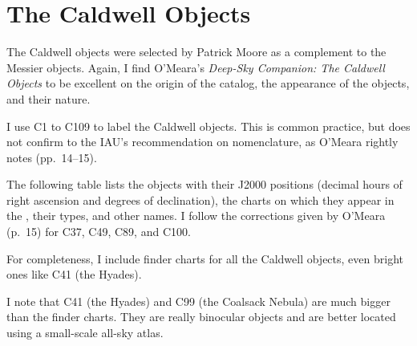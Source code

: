 
\chapter*{The Caldwell Objects}

The Caldwell objects were selected by Patrick Moore as a complement to the Messier objects. Again, I find O’Meara’s \emph{Deep-Sky Companion: The Caldwell Objects} to be excellent on the origin of the catalog, the appearance of the objects, and their nature.

I use C1 to C109 to label the Caldwell objects. This is common practice, but does not confirm to the IAU’s recommendation on nomenclature, as O’Meara rightly notes (pp.\ 14--15).

The following table lists the objects with their J2000 positions (decimal hours of right ascension and degrees of declination), the charts on which they appear in the {\PSA}, their types, and other names. I follow the corrections given by O’Meara (p.\ 15) for C37, C49, C89, and C100.

For completeness, I include finder charts for all the Caldwell objects, even bright ones like C41 (the Hyades).

I note that C41 (the Hyades) and C99 (the Coalsack Nebula) are much bigger than the finder charts. They are really binocular objects and are better located using a small-scale all-sky atlas.


\clearpage



\clearpage


\clearpage


